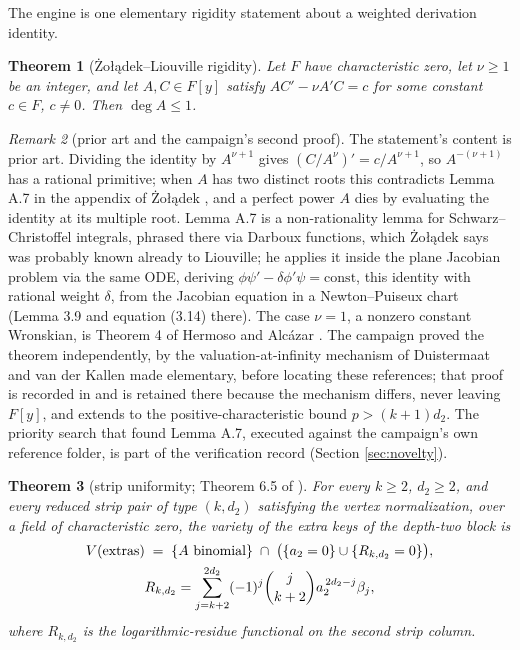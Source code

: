 \documentclass[11pt]{article}
\newtheorem{theorem}{Theorem}[section]
\theoremstyle{definition}
\theoremstyle{remark}
\newtheorem{remark}[theorem]{Remark}
\begin{document}
The engine is one elementary rigidity statement about a weighted derivation identity.

\begin{theorem}[\.Zo{\l}\k{a}dek--Liouville rigidity]\label{thm:rigidity}
Let $F$ have characteristic zero, let $\nu\geq 1$ be an integer, and let $A,C\in F[y]$ satisfy $AC'-\nu A'C=c$ for some constant $c\in F$, $c\neq 0$. Then $\deg A\leq 1$.
\end{theorem}

\begin{remark}[prior art and the campaign's second proof]\label{rem:priorart}
The statement's content is prior art. Dividing the identity by $A^{\nu+1}$ gives $(C/A^\nu)'=c/A^{\nu+1}$, so $A^{-(\nu+1)}$ has a rational primitive; when $A$ has two distinct roots this contradicts Lemma A.7 in the appendix of \.Zo{\l}\k{a}dek \cite{Zoladek}, and a perfect power $A$ dies by evaluating the identity at its multiple root. Lemma A.7 is a non-rationality lemma for Schwarz--Christoffel integrals, phrased there via Darboux functions, which \.Zo{\l}\k{a}dek says was probably known already to Liouville; he applies it inside the plane Jacobian problem via the same ODE, deriving $\phi\psi'-\delta\phi'\psi=\mathrm{const}$, this identity with rational weight $\delta$, from the Jacobian equation in a Newton--Puiseux chart (Lemma 3.9 and equation (3.14) there). The case $\nu=1$, a nonzero constant Wronskian, is Theorem 4 of Hermoso and Alc\'azar \cite{HA}. The campaign proved the theorem independently, by the valuation-at-infinity mechanism of Duistermaat and van der Kallen \cite{DvdK} made elementary, before locating these references; that proof is recorded in \cite{P1} and is retained there because the mechanism differs, never leaving $F[y]$, and extends to the positive-characteristic bound $p>(k+1)d_2$. The priority search that found Lemma A.7, executed against the campaign's own reference folder, is part of the verification record (Section \ref{sec:novelty}).
\end{remark}

\begin{theorem}[strip uniformity; Theorem 6.5 of \cite{P1}]\label{thm:R}
For every $k\geq 2$, $d_2\geq 2$, and every reduced strip pair of type $(k,d_2)$ satisfying the vertex normalization, over a field of characteristic zero, the variety of the extra keys of the depth-two block is
\[
\begin{gathered}
V(\textup{extras})\;=\;\{A \textup{ binomial}\}\;\cap\;\bigl(\{a_2=0\}\cup\{R_{k,d_2}=0\}\bigr),\\
R_{k,d_2}=\sum_{j=k+2}^{2d_2}(-1)^j\binom{j}{k+2}a_2^{\,2d_2-j}\beta_j ,
\end{gathered}
\]
where $R_{k,d_2}$ is the logarithmic-residue functional on the second strip column.
\end{theorem}
\end{document}
